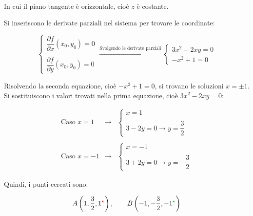 \documentclass[a4paper]{article}
\begin{document}
	\noindent
	In cui il piano tangente è orizzontale, cioè $z$ è costante.\newline
	
	\noindent
	Si inseriscono le derivate parziali nel sistema per trovare le coordinate:
	
	\begin{equation*}
		\begin{cases}
			\dfrac{\partial f}{\partial x}\left(x_{0},y_{0}\right) = 0 \\
			\\
			\dfrac{\partial f}{\partial y}\left(x_{0},y_{0}\right) = 0
		\end{cases}
		\xrightarrow{\text{Svolgendo le derivate parziali}}
		\begin{cases}
			3x^{2} - 2xy = 0 \\
			-x^{2} + 1 = 0
		\end{cases}
	\end{equation*}

	\noindent
	Risolvendo la seconda equazione, cioè $-x^{2} + 1 = 0$, si trovano le soluzioni $x = \pm 1$. Si sostituiscono i valori trovati nella prima equazione, cioè $3x^{2} - 2xy = 0$:
	
	\begin{equation*}
		\begin{array}{lll}
			\text{Caso } x = 1	& \longrightarrow &
			\begin{cases}
				x = 1 \\
				\\
				3 - 2y = 0 \longrightarrow y = \dfrac{3}{2}
			\end{cases} \\
			\\
			\text{Caso } x = -1	& \longrightarrow &
			\begin{cases}
				x = -1 \\
				\\
				3 + 2y = 0 \longrightarrow y = -\dfrac{3}{2}
			\end{cases}
		\end{array}
	\end{equation*}

	\noindent
	Quindi, i punti cercati sono:
	
	\begin{equation*}
		A\left(1, \dfrac{3}{2}, 1^{\textcolor{Red3}{\star}}\right), \hspace{2em} B\left(-1, -\dfrac{3}{2}, -1^{\textcolor{Green4}{\star}}\right)
	\end{equation*}
\end{document}
